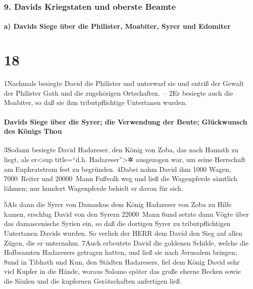 \hypertarget{davids-kriegstaten-und-oberste-beamte}{%
\subsubsection{9. Davids Kriegstaten und oberste
Beamte}\label{davids-kriegstaten-und-oberste-beamte}}

\hypertarget{a-davids-siege-uxfcber-die-philister-moabiter-syrer-und-edomiter}{%
\paragraph{a) Davids Siege über die Philister, Moabiter, Syrer und
Edomiter}\label{a-davids-siege-uxfcber-die-philister-moabiter-syrer-und-edomiter}}

\hypertarget{section-17}{%
\section{18}\label{section-17}}

1Nachmals besiegte David die Philister und unterwarf sie und entriß der
Gewalt der Philister Gath und die zugehörigen Ortschaften.~-- 2Er
besiegte auch die Moabiter, so daß sie ihm tributpflichtige Untertanen
wurden.

\hypertarget{davids-siege-uxfcber-die-syrer-die-verwendung-der-beute-gluxfcckwunsch-des-kuxf6nigs-thou}{%
\paragraph{Davids Siege über die Syrer; die Verwendung der Beute;
Glückwunsch des Königs
Thou}\label{davids-siege-uxfcber-die-syrer-die-verwendung-der-beute-gluxfcckwunsch-des-kuxf6nigs-thou}}

3Sodann besiegte David Hadareser, den König von Zoba, das nach Hamath zu
liegt, als er\textless sup title=``d.h. Hadareser''\textgreater✲
ausgezogen war, um seine Herrschaft am Euphratstrom fest zu begründen.
4Dabei nahm David ihm 1000 Wagen, 7000~Reiter und 20000~Mann Fußvolk weg
und ließ die Wagenpferde sämtlich lähmen; nur hundert Wagenpferde
behielt er davon für sich.

5Als dann die Syrer von Damaskus dem König Hadareser von Zoba zu Hilfe
kamen, erschlug David von den Syrern 22000~Mann 6und setzte dann Vögte
über das damascenische Syrien ein, so daß die dortigen Syrer zu
tributpflichtigen Untertanen Davids wurden. So verlieh der HERR dem
David den Sieg auf allen Zügen, die er unternahm. 7Auch erbeutete David
die goldenen Schilde, welche die Hofbeamten Hadaresers getragen hatten,
und ließ sie nach Jerusalem bringen; 8und in Tibhath und Kun, den
Städten Hadaresers, fiel dem König David sehr viel Kupfer in die Hände,
woraus Salomo später das große eherne Becken sowie die Säulen und die
kupfernen Gerätschaften anfertigen ließ.

